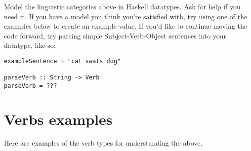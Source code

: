 \documentclass{article}
\begin{document}
Model the linguistic categories above in Haskell datatypes. Ask for help if you need it. If you have a model you think you're satisfied with, try using one of the examples below to create an example value. If you'd like to continue moving the code forward, try parsing simple Subject-Verb-Object sentences into your datatype, like so:

\begin{verbatim}
exampleSentence = "cat swats dog"

parseVerb :: String -> Verb
parseVerb = ???
\end{verbatim}


\section{Verbs examples}

Here are examples of the verb types for understanding the above.
\end{document}
